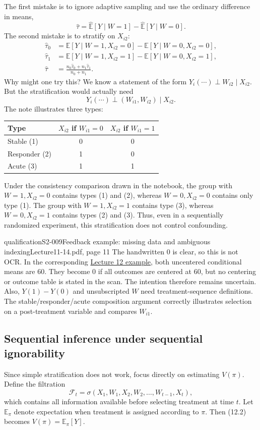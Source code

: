 The first mistake is to ignore adaptive sampling and use the ordinary difference in means,
\[
 \widehat\tau=\widehat{\mathbb E}[Y\mid W=1]
 -\widehat{\mathbb E}[Y\mid W=0].
\]
The second mistake is to stratify on $X_{i2}$:
\begin{align*}
 \widehat\tau_0&=\mathbb E[Y\mid W=1,X_{i2}=0]
 -\mathbb E[Y\mid W=0,X_{i2}=0],\\
 \widehat\tau_1&=\mathbb E[Y\mid W=1,X_{i2}=1]
 -\mathbb E[Y\mid W=0,X_{i2}=1],\\
 \widehat\tau&=\frac{n_0\widehat\tau_0+n_1\widehat\tau_1}{n_0+n_1}.
\end{align*}
Why might one try this? We know a statement of the form $Y_i(\cdots)\perp W_{i2}\mid X_{i2}$. But the stratification would actually need
\[
 Y_i(\cdots)\perp(W_{i1},W_{i2})\mid X_{i2}.
\]
The note illustrates three types:
\begin{center}
\begin{tabular}{lcc}
 Type & $X_{i2}$ if $W_{i1}=0$ & $X_{i2}$ if $W_{i1}=1$\\\hline
 Stable (1) & 0 & 0\\
 Responder (2) & 1 & 0\\
 Acute (3) & 1 & 1
\end{tabular}
\end{center}
Under the consistency comparison drawn in the notebook, the group with $W=1,X_{i2}=0$ contains types (1) and (2), whereas $W=0,X_{i2}=0$ contains only type (1). The group with $W=1,X_{i2}=1$ contains type (3), whereas $W=0,X_{i2}=1$ contains types (2) and (3). Thus, even in a sequentially randomized experiment, this stratification does not control confounding.


\begin{reviewnote}{qualification}{S2-009}{Feedback example: missing data and ambiguous indexing}{Lecture11-14.pdf, page 11}
The handwritten $0$ is clear, so this is not OCR. In the corresponding \href{https://web.stanford.edu/~swager/stats361.pdf}{Lecture 12 example}, both uncentered conditional means are $60$. They become $0$ if all outcomes are centered at $60$, but no centering or outcome table is stated in the scan. The intention therefore remains uncertain. Also, $Y(1)-Y(0)$ and unsubscripted $W$ need treatment-sequence definitions. The stable/responder/acute composition argument correctly illustrates selection on a post-treatment variable and compares $W_{i1}$.
\end{reviewnote}


\subsection{Sequential inference under sequential ignorability}
Since simple stratification does not work, focus directly on estimating $V(\pi)$. Define the filtration
\[
 \mathcal F_t=\sigma(X_1,W_1,X_2,W_2,\ldots,W_{t-1},X_t),
\]
which contains all information available before selecting treatment at time $t$. Let $\mathbb E_\pi$ denote expectation when treatment is assigned according to $\pi$. Then (12.2) becomes $V(\pi)=\mathbb E_\pi[Y]$.

